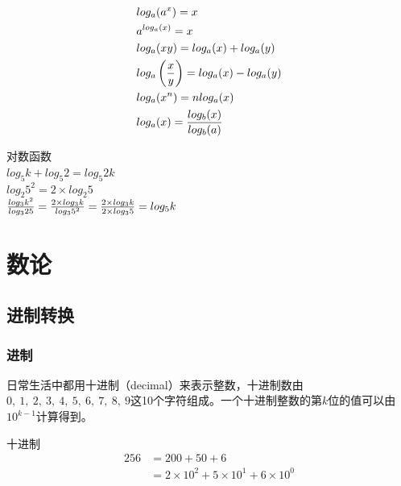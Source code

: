\documentclass[12pt, openany, oneside]{book}
\begin{document}
\begin{tcolorbox}
	\begin{align}
		 & log_a(a^x) = x                                      \\
		 & a^{log_a(x)} = x                                    \\
		 & log_a(xy) = log_a(x) + log_a(y)                     \\
		 & log_a\left({x \over y}\right) = log_a(x) - log_a(y) \\
		 & log_a(x^n) = nlog_a(x)                              \\
		 & log_a(x) = {log_b(x) \over log_b(a)}
	\end{align}
\end{tcolorbox}

\begin{tcolorbox}
	对数函数 \\
	$ log_5{k} + log_5{2} = log_5{2k} $ \\
	$ log_2{5^2} = 2 \times log_2{5} $ \\
	$ {log_3{k^2} \over log_3{25}} = {2 \times log_3{k} \over log_3{5^2}} = {2 \times log_3{k} \over 2 \times log_3{5}} = log_5{k} $
\end{tcolorbox}

\newpage

\chapter{数论}

\section{进制转换}

\subsection{进制}

日常生活中都用十进制（decimal）来表示整数，十进制数由$ 0,\ 1,\ 2,\ 3,\ 4,\ 5,\ 6,\ 7,\ 8,\ 9 $这10个字符组成。一个十进制整数的第$ k $位的值可以由$ 10^{k-1} $计算得到。

\begin{tcolorbox}\nonumber
	十进制
	\begin{align}
		256 & = 200 + 50 + 6                                  \\
		    & = 2 \times 10^2 + 5 \times 10^1 + 6 \times 10^0
	\end{align}
\end{tcolorbox}
\end{document}
